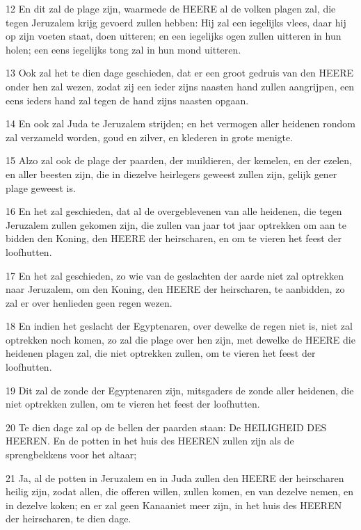 \par 12 En dit zal de plage zijn, waarmede de HEERE al de volken plagen zal, die tegen Jeruzalem krijg gevoerd zullen hebben: Hij zal een iegelijks vlees, daar hij op zijn voeten staat, doen uitteren; en een iegelijks ogen zullen uitteren in hun holen; een eens iegelijks tong zal in hun mond uitteren.
\par 13 Ook zal het te dien dage geschieden, dat er een groot gedruis van den HEERE onder hen zal wezen, zodat zij een ieder zijns naasten hand zullen aangrijpen, een eens ieders hand zal tegen de hand zijns naasten opgaan.
\par 14 En ook zal Juda te Jeruzalem strijden; en het vermogen aller heidenen rondom zal verzameld worden, goud en zilver, en klederen in grote menigte.
\par 15 Alzo zal ook de plage der paarden, der muildieren, der kemelen, en der ezelen, en aller beesten zijn, die in diezelve heirlegers geweest zullen zijn, gelijk gener plage geweest is.
\par 16 En het zal geschieden, dat al de overgeblevenen van alle heidenen, die tegen Jeruzalem zullen gekomen zijn, die zullen van jaar tot jaar optrekken om aan te bidden den Koning, den HEERE der heirscharen, en om te vieren het feest der loofhutten.
\par 17 En het zal geschieden, zo wie van de geslachten der aarde niet zal optrekken naar Jeruzalem, om den Koning, den HEERE der heirscharen, te aanbidden, zo zal er over henlieden geen regen wezen.
\par 18 En indien het geslacht der Egyptenaren, over dewelke de regen niet is, niet zal optrekken noch komen, zo zal die plage over hen zijn, met dewelke de HEERE die heidenen plagen zal, die niet optrekken zullen, om te vieren het feest der loofhutten.
\par 19 Dit zal de zonde der Egyptenaren zijn, mitsgaders de zonde aller heidenen, die niet optrekken zullen, om te vieren het feest der loofhutten.
\par 20 Te dien dage zal op de bellen der paarden staan: De HEILIGHEID DES HEEREN. En de potten in het huis des HEEREN zullen zijn als de sprengbekkens voor het altaar;
\par 21 Ja, al de potten in Jeruzalem en in Juda zullen den HEERE der heirscharen heilig zijn, zodat allen, die offeren willen, zullen komen, en van dezelve nemen, en in dezelve koken; en er zal geen Kanaaniet meer zijn, in het huis des HEEREN der heirscharen, te dien dage.



